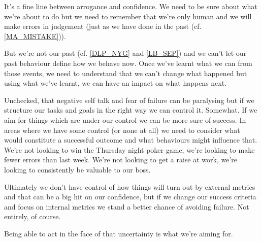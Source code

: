 \cleardoublepage
\begin{multicols}{2}

It's a fine line between arrogance and confidence. We need to be sure about what we're about to do but we need to remember that we're only human and we will make errors in judgement (just as we have done in the past (cf. \ref{MA_MISTAKE})). 

But we're not our past (cf. \ref{DLP_NYG} and \ref{LB_SEP}) and we can't let our past behaviour define how we behave now. Once we've learnt what we can from those events, we need to understand that we can't change what happened but using what we've learnt, we can have an impact on what happens next.

Unchecked, that negative self talk and fear of failure can be paralysing but if we structure our tasks and goals in the right way we can control it. Somewhat. If we aim for things which are under our control we can be more sure of success. In areas where we have some control (or none at all) we need to consider what would constitute a successful outcome and what behaviours might influence that. We're not looking to win the Thursday night poker game, we're looking to make fewer errors than last week. We're not looking to get a raise at work, we're looking to consistently be valuable to our boss.

Ultimately we don't have control of how things will turn out by external metrics and that can be a big hit on our confidence, but if we change our success criteria and focus on internal metrics we stand a better chance of avoiding failure. Not entirely, of course.

Being able to act in the face of that uncertainty is what we're aiming for.



\end{multicols}
\clearpage
